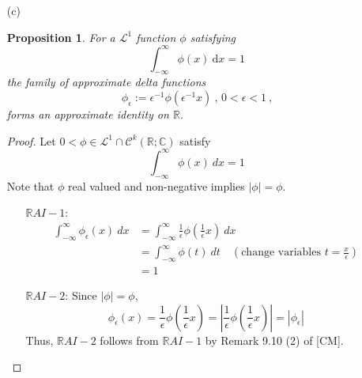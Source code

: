 \documentclass[12pt, reqno]{amsart}
\newtheorem{prop}{Proposition}[section]
\theoremstyle{definition}
\theoremstyle{remark}
\newcommand{\ud}{\mathrm{d}}
\begin{document}
\begin{itemize}
\begin{itemize}
\vspace{0.1 cm}
\item[(c)] 

\begin{prop}
    For a $\mathcal{L}^1$ function $\phi$ satisfying 
    \begin{equation}
        \int_{-\infty}^\infty \phi(x) ~\ud x = 1
    \end{equation}
    the family of approximate delta functions 
    \[
        \phi_\epsilon := \epsilon^{-1} \phi (\epsilon^{-1} x) ~\mbox{, } 0 < \epsilon < 1 ~\mbox{,}
    \]
    forms an approximate identity on $\mathbb{R}$.
\end{prop}

\begin{proof}
    Let $0<\phi\in\mathcal{L}^{1}\cap\mathcal{C}^{k}(\mathbb{R};\mathbb{C})$ satisfy $$\int_{-\infty}^{\infty}\phi(x)\ dx=1$$
Note that $\phi$ real valued and non-negative implies $|\phi|=\phi$.
\begin{itemize}

\item[$\mathbb{R}AI-1$:] \begin{align*}
\int_{-\infty}^{\infty}\phi_{\epsilon}(x)\ dx&= \int_{-\infty}^{\infty} \frac{1}{\epsilon}\phi\left( \frac{1}{\epsilon}x\right)\ dx\\
&= \int_{-\infty}^{\infty}\phi(t)\ dt\quad(\text{change variables }t= \frac{x}{\epsilon})\\
&= 1
\end{align*}

\item[$\mathbb{R}AI-2$:] Since $|\phi|=\phi$, $$\phi_{\epsilon}(x)=\frac{1}{\epsilon}\phi\left( \frac{1}{\epsilon}x\right)=\left| \frac{1}{\epsilon}\phi\left( \frac{1}{\epsilon}x\right)\right|=\left|\phi_{\epsilon}\right|$$Thus, $\mathbb{R}AI-2$ follows from $\mathbb{R}AI-1$ by Remark 9.10 (2) of [CM].


\end{itemize}
\end{proof}
\end{itemize}
\end{itemize}
\end{document}
